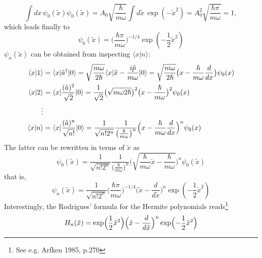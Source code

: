 \begin{equation}
  \int dx \, \psi_0(\tilde{x}) \psi_0(\tilde{x}) = A_0
  \sqrt{\frac{\hbar}{m\omega}} \int d\tilde{x} \,
  \exp(-\tilde{x}^2) = A_0^2 \sqrt{\frac{\hbar\pi}{m\omega}}
  = 1, 
  \label{equ:2.92}
\end{equation}
which leads finally to
\begin{equation}
  \psi_0 (\tilde{x}) =
  \bigl(\frac{\hbar\pi}{m\omega}\bigr)^{-1/4}
  \exp(-\frac{1}{2}\tilde{x}^2)
  \label{equ:2.93}
\end{equation}
$\psi_n(\tilde{x})$ can be obtained from inspecting $\langle x\vert n\rangle $:
  \begin{alignat}{2}
    \langle x\vert 1\rangle  &= \langle x\vert \hat{a}^{\dagger}\vert 0\rangle  =
    \sqrt{\frac{m\omega}{2\hbar}}
    \langle x\vert \hat{x}-\frac{i\hat{p}}{m\omega}\vert 0\rangle  =
    \sqrt{\frac{m\omega}{2\hbar}}\bigl(x -
    \frac{\hbar}{m\omega}\frac{d}{dx}\bigr) \psi_0(x)
    \nonumber \\
    \langle x\vert 2\rangle  &= \langle x\vert \frac{(\hat{a})^2}{\sqrt{2}}\vert 0\rangle  =
    \frac{1}{\sqrt{2}}\bigl(\sqrt{{m\omega}{2\hbar}}\bigr)^2\bigl(x
      - \frac{\hbar}{m\omega}\bigr)^2 \psi_0(x) \nonumber \\
      \vdots\nonumber \\
      \langle x\vert n\rangle  &= 
      \langle x\vert \frac{(\hat{a})^n}{\sqrt{n!}}\vert 0\rangle  =
      \frac{1}{\sqrt{n!2^n}}
      \frac{1}{\bigl(\frac{\hbar}{m\omega}\bigr)^n}
      \Bigl(x - \frac{\hbar}{m\omega}\frac{d}{dx}\Bigr)^n \psi_0(x)
     \label{equ:2.94}
  \end{alignat}
The latter can be rewritten in terms of $\tilde{x}$ as
\begin{equation}
  \psi_0(\tilde{x}) =
  \frac{1}{\sqrt{n!2^n}}
  \frac{1}{\bigl(\frac{\hbar}{m\omega}\bigr)^n}
  \biggl(
  \sqrt{\frac{\hbar}{m\omega}\tilde{x}-\frac{\hbar}{m\omega}}
  \biggr)^n \psi_0(\tilde{x})
  \label{equ:2.95}
\end{equation}
that is,
\begin{equation}
  \psi_n(\tilde{x}) = \frac{1}{\sqrt{n!2^n}}
  \bigl(
  \frac{\hbar\pi}{m\omega}
  \bigr)^{-1/4}
  \bigl(\tilde{x}-\frac{d}{d\tilde{x}}\bigr)^n
  \exp(-\frac{1}{2}\tilde{x}^2)
  \label{equ:2.96}
\end{equation}
Interestingly, the Rodrigues' formula for the Hermite
polynomials reads\footnote{See e.g. Arfken 1985, p.270}
\begin{equation}
  H_n(\tilde{x}) = \exp\Bigl(\frac{1}{2}\tilde{x}^2\Bigr)
  \Bigl(\tilde{x}-\frac{d}{d\tilde{x}}\Bigr)^n
  \exp\Bigl(-\frac{1}{2}\tilde{x}^2\Bigr)
  \label{equ:2.97}
\end{equation}
